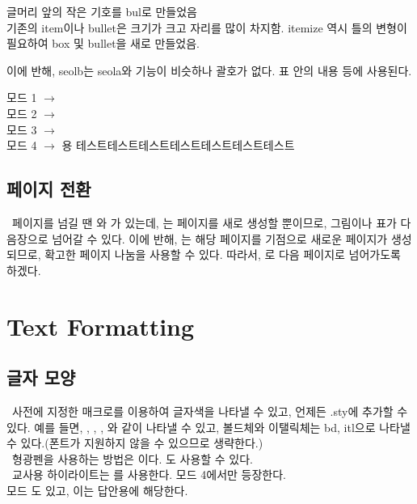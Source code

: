 \bul 글머리 앞의 작은 기호를 bul로 만들었음 \\
기존의 item이나 bullet은 크기가 크고 자리를 많이 차지함.
itemize 역시 틀의 변형이 필요하여 box 및 bullet을 새로 만들었음.

이에 반해, seolb는 seola와 기능이 비슷하나 괄호가 없다. 표 안의 내용 등에 사용된다.

\begin{graybox}
  \bul 모드 1 $\longrightarrow$  \\
  \bul 모드 2 $\longrightarrow$  \\
  \bul 모드 3 $\longrightarrow$  \\
  \bul 모드 4 $\longrightarrow$ 용
  테스트테스트테스트테스트테스트테스트테스트
\end{graybox}



\subsection{페이지 전환}
%
\ 페이지를 넘길 땐 와 가 있는데,
는 페이지를 새로 생성할 뿐이므로, 그림이나 표가 다음장으로 넘어갈 수 있다.
이에 반해, 는 해당 페이지를 기점으로 새로운 페이지가 생성되므로, 확고한 페이지 나눔을 사용할 수 있다.
따라서, 로 다음 페이지로 넘어가도록 하겠다.
\clearpage


\section
{Text Formatting}

\subsection{글자 모양}
%
\ 사전에 지정한 매크로를 이용하여 글자색을 나타낼 수 있고, 언제든 .sty에 추가할 수 있다.
예를 들면, , , ,   
와 같이 나타낼 수 있고, 볼드체와 이탤릭체는 bd, itl으로 나타낼 수 있다.(폰트가 지원하지 않을 수 있으므로 생략한다.) \\
\ 형광펜을 사용하는 방법은  이다. 도 사용할 수 있다. \\
\ 교사용 하이라이트는 를 사용한다. 모드 4에서만 등장한다.\\
모드 도 있고, 이는 답안용에 해당한다. 

